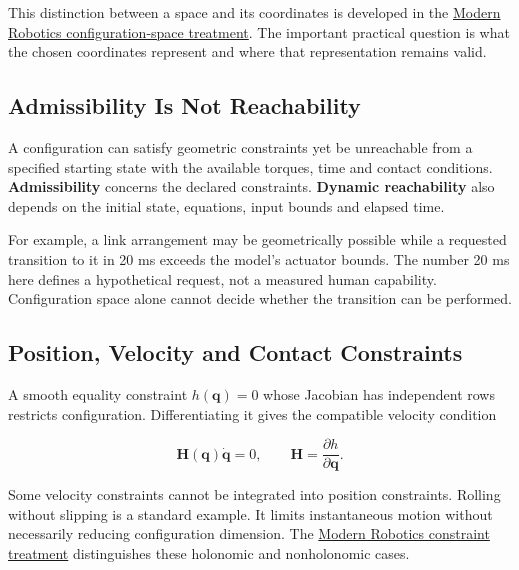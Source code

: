 This distinction between a space and its coordinates is developed in the \href{https://modernrobotics.northwestern.edu/nu-gm-book-resource/2-3-1-configuration-space-topology/}{Modern Robotics configuration-space treatment}. The important practical question is what the chosen coordinates represent and where that representation remains valid.

\subsection{Admissibility Is Not Reachability}\label{ch02:admissibility-is-not-reachability}

\protect{}\label{ch02:constraints-not-all-configurations-are-allowed}{}

A configuration can satisfy geometric constraints yet be unreachable from a specified starting state with the available torques, time and contact conditions. \textbf{Admissibility} concerns the declared constraints. \textbf{Dynamic reachability} also depends on the initial state, equations, input bounds and elapsed time.

For example, a link arrangement may be geometrically possible while a requested transition to it in 20 ms exceeds the model's actuator bounds. The number 20 ms here defines a hypothetical request, not a measured human capability. Configuration space alone cannot decide whether the transition can be performed.

\subsection{Position, Velocity and Contact Constraints}\label{ch02:position-velocity-and-contact-constraints}

\protect{}\label{ch02:constraints-in-the-double-pendulum-model}{} \protect{}\label{box:ch02_golf_constraints}{}

A smooth equality constraint \(h(\bm q)=0\) whose Jacobian has independent rows restricts configuration. Differentiating it gives the compatible velocity condition

\[
\bm H(\bm q)\dot{\bm q}=0,\qquad
\bm H=\frac{\partial h}{\partial\bm q}.
\]

Some velocity constraints cannot be integrated into position constraints. Rolling without slipping is a standard example. It limits instantaneous motion without necessarily reducing configuration dimension. The \href{https://modernrobotics.northwestern.edu/nu-gm-book-resource/2-4-configuration-and-velocity-constraints/}{Modern Robotics constraint treatment} distinguishes these holonomic and nonholonomic cases.

